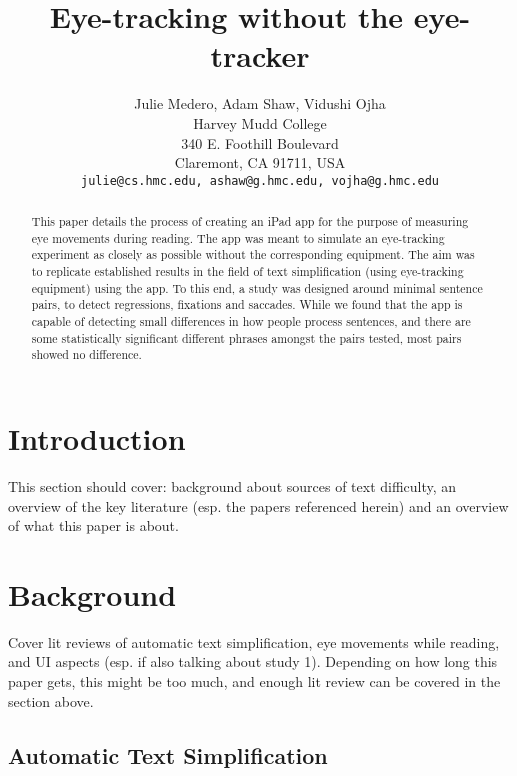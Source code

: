 \documentclass[11pt,letterpaper]{article}
\title{Eye-tracking without the eye-tracker\Thanks{Acknowledgements and thanks go here.}}
\author{Julie Medero, Adam Shaw, Vidushi Ojha\\
	    Harvey Mudd College\\
	    340 E. Foothill Boulevard\\
	    Claremont, CA 91711, USA\\
	    {\tt julie@cs.hmc.edu, ashaw@g.hmc.edu, vojha@g.hmc.edu}}
\date{}
\begin{document}
\maketitle
\begin{abstract}
  This paper details the process of creating an iPad app for the purpose of measuring eye movements during reading. The app was meant to simulate an eye-tracking experiment as closely as possible without the corresponding equipment. The aim was to replicate established results in the field of text simplification (using eye-tracking equipment) using the app. To this end, a study was designed around minimal sentence pairs, to detect regressions, fixations and saccades. While we found that the app is capable of detecting small differences in how people process sentences, and there are some statistically significant different phrases amongst the pairs tested, most pairs showed no difference.
\end{abstract}

\section{Introduction}

This section should cover: background about sources of text difficulty, an overview of the key literature (esp. the papers referenced herein) and an overview of what this paper is about.

\section{Background}

Cover lit reviews of automatic text simplification, eye movements while reading, and UI aspects (esp. if also talking about study 1). Depending on how long this paper gets, this might be too much, and enough lit review can be covered in the section above.



\subsection{Automatic Text Simplification}
\end{document}
